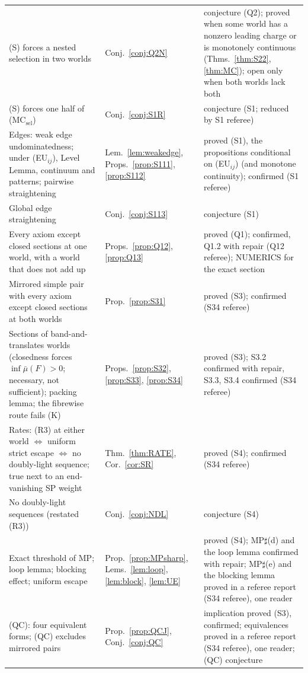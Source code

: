 \documentclass[11pt]{article}
\theoremstyle{definition}
\theoremstyle{remark}
\begin{document}
{\begin{longtable}{>{\raggedright\arraybackslash}p{6.4cm}>{\raggedright\arraybackslash}p{2.1cm}>{\raggedright\arraybackslash}p{5.6cm}}
(S) forces a nested selection in two worlds & Conj.~\ref{conj:Q2N} & conjecture (Q2); proved when some world has a nonzero leading charge or is monotonely continuous (Thms.~\ref{thm:S22}, \ref{thm:MC}); open only when both worlds lack both\\
(S) forces one half of (MC$_{\mathrm{sel}}$) & Conj.~\ref{conj:S1R} & conjecture (S1; reduced by S1 referee)\\
Edges: weak edge undominatedness; under (EU$_{ij}$), Level Lemma, continuum and patterns; pairwise straightening & Lem.~\ref{lem:weakedge}, Props.~\ref{prop:S111}, \ref{prop:S112} & proved (S1), the propositions conditional on (EU$_{ij}$) (and monotone continuity); confirmed (S1 referee)\\
Global edge straightening & Conj.~\ref{conj:S113} & conjecture (S1)\\
Every axiom except closed sections at one world, with a world that does not add up & Props.~\ref{prop:Q12}, \ref{prop:Q13} & proved (Q1); confirmed, Q1.2 with repair (Q12 referee); NUMERICS for the exact section\\
Mirrored simple pair with every axiom except closed sections at both worlds & Prop.~\ref{prop:S31} & proved (S3); confirmed (S34 referee)\\
Sections of band-and-translates worlds (closedness forces $\inf\bar\mu(F)>0$; necessary, not sufficient); packing lemma; the fibrewise route fails (K) & Props.~\ref{prop:S32}, \ref{prop:S33}, \ref{prop:S34} & proved (S3); S3.2 confirmed with repair, S3.3, S3.4 confirmed (S34 referee)\\
Rates: (R3) at either world $\iff$ uniform strict escape $\iff$ no doubly-light sequence; true next to an end-vanishing SP weight & Thm.~\ref{thm:RATE}, Cor.~\ref{cor:SR} & proved (S4); confirmed (S34 referee)\\
No doubly-light sequences (restated (R3)) & Conj.~\ref{conj:NDL} & conjecture (S4)\\
Exact threshold of MP; loop lemma; blocking effect; uniform escape & Prop.~\ref{prop:MPsharp}, Lems.~\ref{lem:loop}, \ref{lem:block}, \ref{lem:UE} & proved (S4); MP$\sharp$(d) and the loop lemma confirmed with repair; MP$\sharp$(e) and the blocking lemma proved in a referee report (S34 referee), one reader\\
(QC): four equivalent forms; (QC) excludes mirrored pairs & Prop.~\ref{prop:QCJ}, Conj.~\ref{conj:QC} & implication proved (S3), confirmed; equivalences proved in a referee report (S34 referee), one reader; (QC) conjecture\\

\end{longtable}}
\end{document}
